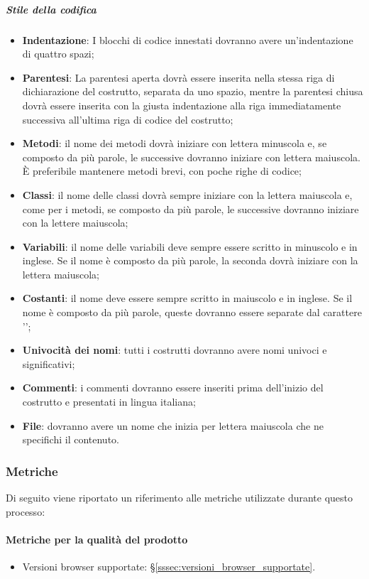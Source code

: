 \subparagraph{Stile della codifica}    \label{subparagraph:Stile della codifica}
\begin{itemize}
    \item \textbf{Indentazione}: I blocchi di codice innestati dovranno avere un'indentazione di quattro spazi;
    \item \textbf{Parentesi}: La parentesi aperta dovrà essere inserita nella stessa riga di dichiarazione del costrutto, separata da uno spazio, mentre
          la parentesi chiusa dovrà essere inserita con la giusta indentazione alla riga immediatamente successiva all'ultima riga di
          codice del costrutto;
    \item \textbf{Metodi}: il nome dei metodi dovrà iniziare con lettera minuscola e, se composto da più parole, le successive dovranno iniziare con lettera
          maiuscola. È preferibile mantenere metodi brevi, con poche righe di codice;
    \item \textbf{Classi}: il nome delle classi dovrà sempre iniziare con la lettera maiuscola e, come per i metodi, se composto da più parole, le successive
          dovranno iniziare con la lettere maiuscola;
    \item \textbf{Variabili}: il nome delle variabili deve sempre essere scritto in minuscolo e in inglese. Se il nome è composto da più parole, la seconda
          dovrà iniziare con la lettera maiuscola;
    \item \textbf{Costanti}: il nome deve essere sempre scritto in maiuscolo e in inglese. Se il nome è composto da più parole, queste dovranno essere separate
          dal carattere '\textunderscore';
    \item \textbf{Univocità dei nomi}: tutti i costrutti dovranno avere nomi univoci e significativi;
    \item \textbf{Commenti}: i commenti dovranno essere inseriti prima dell'inizio del costrutto e presentati in lingua italiana;
    \item \textbf{File}: dovranno avere un nome che inizia per lettera maiuscola che ne specifichi il contenuto.
\end{itemize}





\subsubsection{Metriche}
Di seguito viene riportato un riferimento alle metriche utilizzate durante questo processo:
\paragraph {Metriche per la qualità del prodotto}
\begin{itemize}
        \item Versioni browser supportate: §\ref{sssec:versioni_browser_supportate}.     
\end{itemize}
